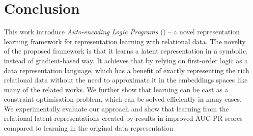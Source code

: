 \section{Conclusion}


This work introduce \textit{Auto-encoding Logic Programs} () -- a novel representation learning framework for representation learning with relational data.
The novelty of the proposed framework is that it learns a latent representation in a symbolic, instead of gradient-based way.
It achieves that by relying on first-order logic as a data representation language, which has a benefit of exactly representing the rich relational data without the need to approximate it in the embeddings spaces like many of the related works.
We further show that learning  can be cast as a constraint optimisation problem, which can be solved efficiently in many cases.
We experimentally evaluate our approach and show that learning from the relational latent representations created by  results in improved AUC-PR scores compared to learning in the original data representation.


\cleardoublepage


